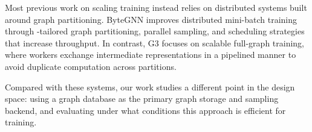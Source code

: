 Most previous work on scaling  training instead relies on distributed
systems built around graph partitioning. ByteGNN improves distributed mini-batch
training through -tailored graph partitioning, parallel sampling, and
scheduling strategies that increase throughput. In contrast, G3 focuses on scalable
full-graph training, where workers exchange intermediate representations in a pipelined
manner to avoid duplicate computation across partitions.

Compared with these systems, our work studies a different point in the design space:
using a graph database as the primary graph storage and sampling backend, and
evaluating under what conditions this approach is efficient for  training.
